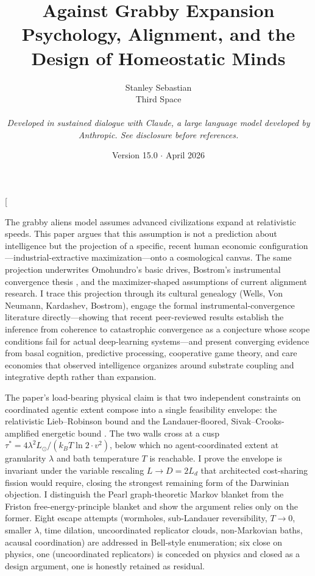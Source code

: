 \documentclass[11pt,twocolumn]{article}
\title{\vspace{-1em}\Large \textbf{Against Grabby Expansion}\\[0.3em]
\large Psychology, Alignment, and the Design of Homeostatic Minds}
\author{Stanley Sebastian\\[0.2em]
\small Third Space\\[0.6em]
\parbox[t]{0.62\textwidth}{\centering\small\itshape Developed in sustained dialogue with Claude, a large language model developed by Anthropic. See disclosure before references.}}
\date{\small Version 15.0 \(\cdot\) April 2026}
\newcommand{\taustar}{{\tau^{*}}}
\newcommand{\kBT}{k_{B}T}
\newcommand{\Lsun}{L_{\odot}}
\begin{document}
\twocolumn[
\maketitle
\begin{onecolabstract}
\noindent The grabby aliens model \citep{Hanson2021} assumes
advanced civilizations expand at relativistic speeds. This paper argues that
this assumption is not a prediction about intelligence but the projection of
a specific, recent human economic configuration—industrial-extractive
maximization—onto a cosmological canvas. The same projection underwrites
Omohundro's basic drives, Bostrom's instrumental convergence thesis
\citep{Bostrom2012,Bostrom2014}, and the maximizer-shaped assumptions of
current alignment research. I trace this projection through its cultural
genealogy (Wells, Von Neumann, Kardashev, Bostrom), engage the formal
instrumental-convergence literature directly—showing that recent peer-reviewed
results \citep{Gallow2025,Sharadin2025,MullerCannon2022} establish the
inference from coherence to catastrophic convergence as a conjecture whose
scope conditions fail for actual deep-learning systems—and present converging
evidence from basal cognition, predictive processing, cooperative game theory,
and care economies that observed intelligence organizes around substrate
coupling and integrative depth rather than expansion.

\smallskip
\noindent The paper's load-bearing physical claim is that two
independent constraints on coordinated agentic extent compose into a
single feasibility envelope: the relativistic Lieb--Robinson bound
\citep{LiebRobinson1972,FossFeig2015,Tran2021} and the
Landauer-floored, Sivak--Crooks-amplified energetic bound
\citep{Landauer1961,Berut2012,SivakCrooks2012,Boyd2022}. The two
walls cross at a cusp $\taustar = 4\lambda^{2}\Lsun/(\kBT \ln 2 \cdot v^{2})$,
below which no agent-coordinated extent at granularity $\lambda$ and
bath temperature $T$ is reachable. I prove the envelope is invariant
under the variable rescaling $L \to D = 2L_{d}$ that architected
cost-sharing fission would require, closing the strongest remaining
form of the Darwinian objection. I distinguish the Pearl
graph-theoretic Markov blanket from the Friston free-energy-principle
blanket \citep{Bruineberg2022,Aguilera2021} and show the argument
relies only on the former. Eight escape attempts (wormholes,
sub-Landauer reversibility, $T \to 0$, smaller $\lambda$, time
dilation, uncoordinated replicator clouds, non-Markovian baths, acausal
coordination) are addressed in Bell-style enumeration; six close on
physics, one (uncoordinated replicators) is conceded on physics and
closed as a design argument, one is honestly retained as residual.


\end{onecolabstract}
\end{document}
